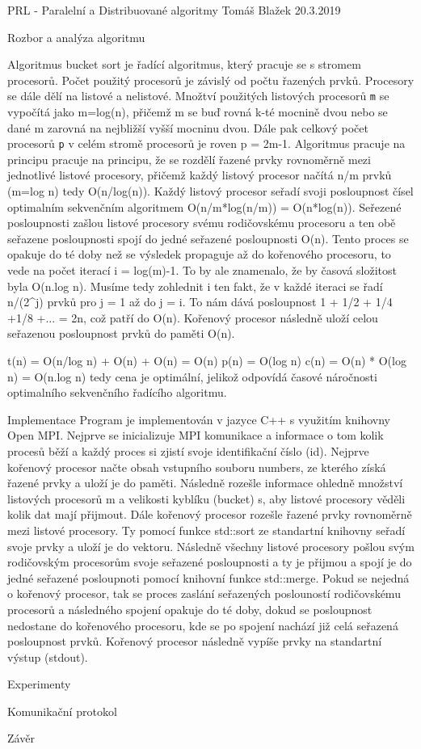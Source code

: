 PRL - Paralelní a Distribuované algoritmy
Tomáš Blažek 
20.3.2019

Rozbor a analýza algoritmu

Algoritmus bucket sort je řadící algoritmus, který pracuje se s stromem procesorů. Počet použitý procesorů je závislý od počtu řazených prvků. Procesory se dále dělí na listové a nelistové. Množtví použitých listových procesorů \texttt{m} se vypočítá jako m=log(n), přičemž m se buď rovná k-té mocnině dvou nebo se dané m zarovná na nejbližší vyšší mocninu dvou. Dále pak celkový počet procesorů \texttt{p} v celém stromě procesorů je roven p = 2m-1. Algoritmus pracuje na principu pracuje na principu, že se rozdělí řazené prvky rovnoměrně mezi jednotlivé listové procesory, přičemž každý listový procesor načítá n/m prvků (m=log n) tedy O(n/log(n)). Každý listový procesor seřadí svoji posloupnost čísel optimalním sekvenčním algoritmem O(n/m*log(n/m)) = O(n*log(n)). Seřezené posloupnosti zašlou listové procesory svému rodičovskému procesoru a ten obě seřazene posloupnosti spojí do jedné seřazené posloupnosti O(n). Tento proces se opakuje do té doby než se výsledek propaguje až do kořenového procesoru, to vede na počet iterací  i = log(m)-1. To by ale znamenalo, že by časová složitost byla O(n.log n). Musíme tedy zohlednit i ten fakt, že v každé iteraci se řadí n/(2^j) prvků pro j = 1 až do j = i. To nám dává posloupnost 1 + 1/2 + 1/4 +1/8 +... = 2n, což patří do O(n). Kořenový procesor následně uloží celou seřazenou posloupnost prvků do paměti O(n). 

t(n) = O(n/log n) + O(n) + O(n) = O(n)
p(n) = O(log n)
c(n) = O(n) * O(log n) = O(n.log n) tedy cena je optimální, jelikož odpovídá časové náročnosti optimalního sekvenčního řadícího algoritmu. 

Implementace
Program je implementován v jazyce C++ s využitím knihovny Open MPI. Nejprve se inicializuje MPI komunikace a informace o tom kolik procesů běží a každý proces si zjistí svoje identifikační číslo (id). Nejprve kořenový procesor načte obsah vstupního souboru numbers, ze kterého získá řazené prvky a uloží je do paměti. Následně rozešle informace ohledně množství listových procesorů m a velikosti kyblíku (bucket) s, aby listové procesory věděli kolik dat mají přijmout. Dále kořenový procesor rozešle řazené prvky rovnoměrně mezi listové procesory. Ty pomocí funkce std::sort ze standartní knihovny seřadí svoje prvky a uloží je do vektoru. Následně všechny listové procesory pošlou svým rodičovským procesorům svoje seřazené posloupnosti a ty je přijmou a spojí je do jedné seřazené posloupnoti pomocí knihovní funkce std::merge. Pokud se nejedná o kořenový procesor, tak se proces zaslání seřazených poslouností rodičovskému procesorů a následného spojení opakuje do té doby, dokud se posloupnost nedostane do kořenového procesoru, kde se po spojení nachází již celá seřazená posloupnost prvků. Kořenový procesor následně vypíše prvky na standartní výstup (stdout).

Experimenty

Komunikační protokol

Závěr